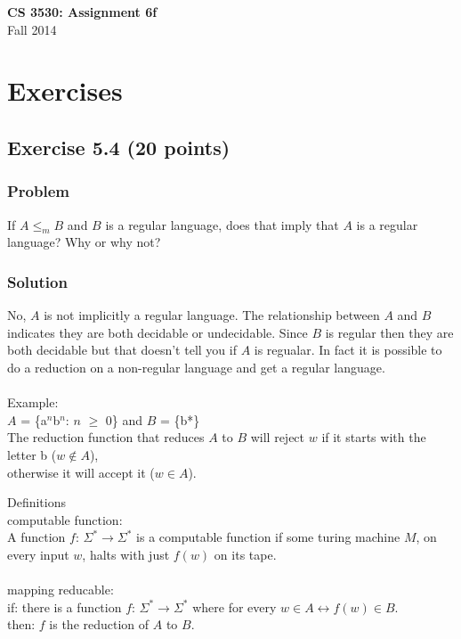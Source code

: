 \documentclass{article}
\begin{document}
\begin{center}
\textbf{\Large CS 3530: Assignment 6f} \\[2mm]
Fall 2014
\end{center}

\raggedright

\section*{Exercises}

\subsection*{Exercise 5.4 (20 points)}

\subsubsection*{Problem}

If $A\leq_m B$ and $B$ is a regular language, does that imply that
$A$ is a regular language? Why or why not?

\subsubsection*{Solution}

No, $A$ is not implicitly a regular language.
The relationship between $A$ and $B$ indicates they are both
decidable or undecidable. Since $B$ is regular then they are both decidable
but that doesn't tell you if $A$ is regualar. In fact it is possible to do a 
reduction on a non-regular language and get a regular language. \\ \ \\ 

Example: \\
$A$ = \{a$^n$b$^n$: $n$ $\ge$ 0\} and $B$ = \{b*\} \\ 
The reduction function that reduces $A$ to $B$ will reject $w$ 
if it starts with the letter b ($w \notin A$), \\
otherwise it will accept it ($w \in A$). \\



\null
\vfill

Definitions \\
computable function:\\
A function $f$: $\Sigma^* \rightarrow \Sigma^*$ is a computable function
if some turing machine $M$, on every input $w$, halts with just $f(w)$ on its 
tape.\\ \ \\

mapping reducable: \\
if: there is a function $f$: $\Sigma^* \rightarrow \Sigma^*$
where for every $w \in A \leftrightarrow f(w) \in B$. \\
then: $f$ is the reduction of $A$ to $B$.
\end{document}
